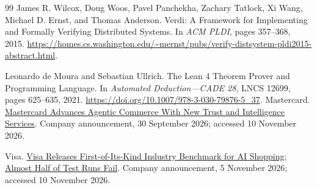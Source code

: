 \begin{thebibliography}{99}
James R. Wilcox, Doug Woos, Pavel Panchekha, Zachary Tatlock, Xi Wang,
Michael D. Ernst, and Thomas Anderson.
Verdi: A Framework for Implementing and Formally Verifying Distributed Systems.
In \emph{ACM PLDI}, pages 357--368, 2015.
\url{https://homes.cs.washington.edu/~mernst/pubs/verify-distsystem-pldi2015-abstract.html}.

Leonardo de Moura and Sebastian Ullrich.
The Lean 4 Theorem Prover and Programming Language.
In \emph{Automated Deduction---CADE 28}, LNCS 12699, pages 625--635, 2021.
\url{https://doi.org/10.1007/978-3-030-79876-5_37}.
Mastercard.
\href{https://investor.mastercard.com/investor-news/investor-news-details/2026/Mastercard-Advances-Agentic-Commerce-With-New-Trust-and-Intelligence-Services/default.aspx}{Mastercard Advances Agentic Commerce With New Trust and Intelligence Services}.
Company announcement, 30 September 2026; accessed 10 November 2026.

Visa.
\href{https://investor.visa.com/news/news-details/2026/Visa-Releases-First-of-Its-Kind-Industry-Benchmark-for-AI-Shopping-Almost-Half-of-Test-Runs-Fail/default.aspx}{Visa Releases First-of-Its-Kind Industry Benchmark for AI Shopping; Almost Half of Test Runs Fail}.
Company announcement, 5 November 2026; accessed 10 November 2026.

\end{thebibliography}
